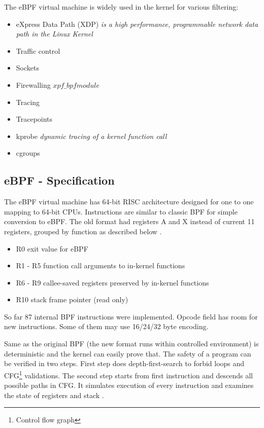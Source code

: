 The eBPF virtual machine is widely used in the kernel for various filtering:
\begin{itemize}
	\item eXpress Data Path (XDP) \textit{is a high performance, programmable network data path in the Linux Kernel}
    \item Traffic control
    \item Sockets
    \item Firewalling \textit{\(xpf\_bpf module\)}
    \item Tracing
    \item Tracepoints
    \item kprobe \textit{dynamic tracing of a kernel function call}
    \item cgroups
\end{itemize}

\subsection{eBPF - Specification}
The eBPF virtual machine has 64-bit RISC architecture designed for one to one mapping to 64-bit CPUs.
Instructions are similar to classic BPF for simple conversion to eBPF.
The old format had registers A and X instead of current 11 registers, grouped by function as described below \cite{kernel_bpf_specification}.
\pagebreak
\begin{itemize}
\item R0 exit value for eBPF
\item R1 - R5 function call arguments to in-kernel functions
\item R6 - R9 callee-saved registers preserved by in-kernel functions
\item R10 stack frame pointer (read only)
\end{itemize}

So far 87 internal BPF instructions were implemented. Opcode field has room for new instructions. Some of them may use 16/24/32 byte encoding.

Same as the original BPF (the new format runs within controlled environment) is deterministic and the kernel can easily prove that.
The safety of a program can be verified in two steps.
First step does depth-first-search to forbid  loops and CFG\footnote{Control flow graph} validations.
The second step starts from first instruction and descends all possible paths in CFG. It simulates execution of every instruction and examines the state of registers and stack \cite{kernel_bpf_specification}.

